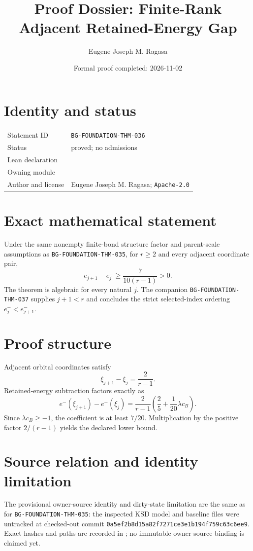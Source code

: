\documentclass[10pt]{article}
\title{Proof Dossier: Finite-Rank Adjacent Retained-Energy Gap}
\author{Eugene Joseph M. Ragasa}
\date{Formal proof completed: 2026-11-02}
\begin{document}
\raggedright
\maketitle

\section{Identity and status}
\begin{tabularx}{\textwidth}{@{}lY@{}}
\toprule
Statement ID & \texttt{BG-FOUNDATION-THM-036} \\
Status & proved; no admissions \\
Lean declaration &  \\
Owning module &  \\
Author and license & Eugene Joseph M. Ragasa; \texttt{Apache-2.0} \\
\bottomrule
\end{tabularx}

\section{Exact mathematical statement}
Under the same nonempty finite-bond structure factor and parent-scale assumptions as
\texttt{BG-FOUNDATION-THM-035}, for $r\ge2$ and every adjacent coordinate pair,
\[
 e^-_{j+1}-e^-_j\ge\frac{7}{10(r-1)}>0.
\]
The theorem is algebraic for every natural $j$. The companion
\texttt{BG-FOUNDATION-THM-037} supplies $j+1<r$ and concludes the strict selected-index ordering
$e^-_j<e^-_{j+1}$.

\section{Proof structure}
Adjacent orbital coordinates satisfy
\[
 \xi_{j+1}-\xi_j=\frac{2}{r-1}.
\]
Retained-energy subtraction factors exactly as
\[
 e^-(\xi_{j+1})-e^-(\xi_j)
 =\frac{2}{r-1}\left(\frac25+\frac1{20}\lambda c_B\right).
\]
Since $\lambda c_B\ge-1$, the coefficient is at least $7/20$. Multiplication by the positive
factor $2/(r-1)$ yields the declared lower bound.

\section{Source relation and identity limitation}
The provisional owner-source identity and dirty-state limitation are the same as for
\texttt{BG-FOUNDATION-THM-035}: the inspected KSD model and baseline files were untracked at
checked-out commit \texttt{0a5ef2b8d15a82f7271ce3e1b194f759c63c6ee9}. Exact hashes and paths
are recorded in ; no immutable owner-source binding is claimed yet.
\end{document}
